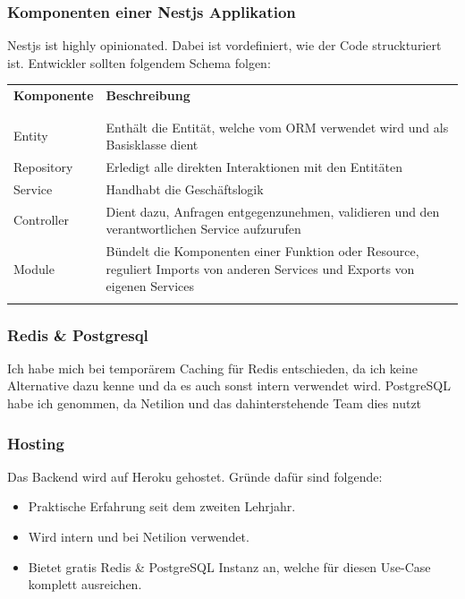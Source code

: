 \subsubsection{Komponenten einer Nestjs Applikation}
Nestjs ist highly opinionated. Dabei ist vordefiniert, wie der Code struckturiert ist. Entwickler sollten folgendem Schema folgen:
\begin{table}[H]
  \begin{tabularx}{\textwidth}{l X }
  \textbf{Komponente} & \textbf{Beschreibung} \\ \\\hline \\
  Entity & Enthält die Entität, welche vom ORM verwendet wird und als Basisklasse dient\\
  Repository & Erledigt alle direkten Interaktionen mit den Entitäten \\
  Service & Handhabt die Geschäftslogik \\
  Controller & Dient dazu, Anfragen entgegenzunehmen, validieren und den verantwortlichen Service aufzurufen \\
  Module & Bündelt die Komponenten einer Funktion oder Resource, reguliert Imports von anderen Services und Exports von eigenen Services \\
  \\\hline
  \end{tabularx}
\end{table}
\subsubsection{Redis \& Postgresql}
Ich habe mich bei temporärem Caching für Redis entschieden, da ich keine Alternative dazu kenne und da es auch sonst intern verwendet wird. PostgreSQL habe ich genommen, da Netilion und das dahinterstehende Team dies nutzt
\subsubsection{Hosting}
Das Backend wird auf Heroku gehostet. Gründe dafür sind folgende:
\begin{itemize}
  \item Praktische Erfahrung seit dem zweiten Lehrjahr.
  \item Wird intern und bei Netilion verwendet.
  \item Bietet gratis Redis \& PostgreSQL Instanz an, welche für diesen Use-Case komplett ausreichen.
\end{itemize}
